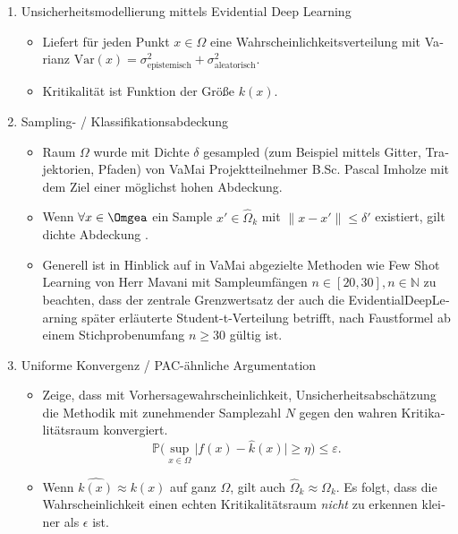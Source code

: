 \begin{otherlanguage}{ngerman}
\begin{enumerate}
  \item Unsicherheitsmodellierung mittels Evidential Deep Learning
  \begin{itemize}
    \item Liefert für jeden Punkt $x \in \Omega$ eine Wahrscheinlichkeitsverteilung mit Varianz $\mathrm{Var}(x) = \sigma^{2}_{\text{epistemisch}} + \sigma^{2}_{\text{aleatorisch}}$.
    \item Kritikalität ist Funktion der Größe $k(x)$.
  \end{itemize}
  \item Sampling- / Klassifikationsabdeckung
  \begin{itemize}
    \item Raum $\Omega$ wurde mit Dichte $\delta$ gesampled (zum Beispiel mittels Gitter, Trajektorien, Pfaden) von VaMai Projektteilnehmer B.Sc. Pascal Imholze mit dem Ziel einer möglichst hohen Abdeckung.
    \item Wenn $\forall x \in \Omgea$ ein Sample $x' \in \widehat{\Omega}_k$ mit $\lVert x - x' \rVert \le \delta'$ existiert, gilt \glqq dichte Abdeckung \grqq.
    \item Generell ist in Hinblick auf in VaMai abgezielte Methoden wie \glq Few Shot Learning \grqq von Herr Mavani mit Sampleumfängen $n \in [20, 30], n \in \mathbb{N}$ zu beachten, dass der zentrale Grenzwertsatz der auch die \gls{EvidentialDeepLearning} später erläuterte Student-t-Verteilung betrifft, nach Faustformel ab einem Stichprobenumfang $n \geq 30$ gültig ist. %
  \end{itemize}
  \item Uniforme Konvergenz / PAC-ähnliche Argumentation
  \begin{itemize}
    \item Zeige, dass mit Vorhersagewahrscheinlichkeit, Unsicherheitsabschätzung die Methodik mit zunehmender Samplezahl $N$ gegen den wahren Kritikalitätsraum konvergiert. 
    \[
    \mathbb{P}\bigl( \sup_{x \in \Omega} \bigl\lvert f(x) - \widehat{k}(x) \bigr\rvert \ge \eta \bigr) \le \varepsilon.
    \]
    \item Wenn $\widehat{k(x)} \approx k(x)$ auf ganz $\Omega$, gilt auch $\widehat{\Omega}_{k} \approx \Omega_{k}$. Es folgt, dass die Wahrscheinlichkeit einen echten Kritikalitätsraum \textit{nicht} zu erkennen kleiner als $\epsilon$ ist.
  \end{itemize}

\end{enumerate}


\end{otherlanguage}
